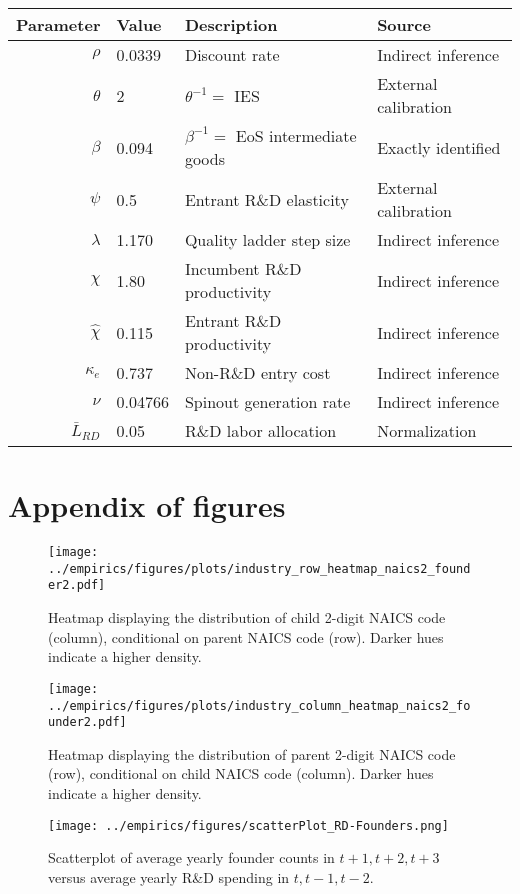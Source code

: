 \documentclass[11pt,english]{article}
\theoremstyle{remark}
\begin{document}
\begin{table}[!htb]
	\centering
	\label{calibration_2_parameters}
	\begin{tabular}{rlll}
		\toprule \toprule
		Parameter & Value & Description & Source \tabularnewline
		\midrule
		$\rho$ & 0.0339 & Discount rate  & Indirect inference \tabularnewline
		$\theta$ & 2 & $\theta^{-1} = $ IES & External calibration 
		\tabularnewline
		$\beta$ & 0.094 & $\beta^{-1} = $ EoS intermediate goods & Exactly identified \tabularnewline 
		$\psi$ & 0.5 & Entrant R\&D elasticity & External calibration \tabularnewline
		$\lambda$ & 1.170 & Quality ladder step size & Indirect inference 
		\tabularnewline
		$\chi$ & 1.80 & Incumbent R\&D productivity & Indirect inference 
		\tabularnewline
		$\hat{\chi}$ & 0.115 & Entrant R\&D productivity & Indirect inference \tabularnewline 
		$\kappa_e$ & 0.737 & Non-R\&D entry cost & Indirect inference \tabularnewline
		$\nu$ & 0.04766 & Spinout generation rate  & Indirect inference\tabularnewline
		$\bar{L}_{RD}$ & 0.05 & R\&D labor allocation  & Normalization \tabularnewline
		\bottomrule
	\end{tabular}
\end{table}

\newpage
\section{Appendix of figures}

\begin{figure}[!htb]
	\centering
	\texttt{[image: ../empirics/figures/plots/industry\_row\_heatmap\_naics2\_founder2.pdf]}
	\caption{Heatmap displaying the distribution of child 2-digit NAICS code (column), conditional on parent NAICS code (row). Darker hues indicate a higher density.}
	\label{figure:industry_row_heatmap_naics2_founder2}
\end{figure}

\begin{figure}[!htb]
	\centering
	\texttt{[image: ../empirics/figures/plots/industry\_column\_heatmap\_naics2\_founder2.pdf]}
	\caption{Heatmap displaying the distribution of parent 2-digit NAICS code (row), conditional on child NAICS code (column). Darker hues indicate a higher density.}
	\label{figure:industry_column_heatmap_naics2_founder2}
\end{figure}

\begin{figure}[!htb]
	\centering
	\texttt{[image: ../empirics/figures/scatterPlot\_RD-Founders.png]}
	\caption{Scatterplot of average yearly founder counts in $t+1,t+2,t+3$ versus average yearly R\&D spending in $t,t-1,t-2$.}
	\label{figure:scatterPlot_RD-Founders}
\end{figure}
\end{document}
